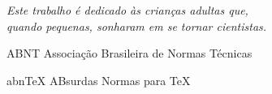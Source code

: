 \documentclass[
	12pt,				%
	openright,			%
	twoside,			%
	a4paper,			%
	english,			%
	french,				%
	spanish,			%
	brazil				%
	]{abntex2}
\begin{document}
        

      
  

\begin{dedicatoria}
   \vspace*{\fill}
   \centering
   \noindent
   \textit{ Este trabalho é dedicado às crianças adultas que,\\
   quando pequenas, sonharam em se tornar cientistas.} \vspace*{\fill}
\end{dedicatoria}

\begin{agradecimentos}

\end{agradecimentos}

\listoffigures*
\cleardoublepage

\listoftables*
\cleardoublepage

\begin{siglas}
  \item[ABNT] Associação Brasileira de Normas Técnicas
  \item[abnTeX] ABsurdas Normas para TeX
\end{siglas}
\end{document}

